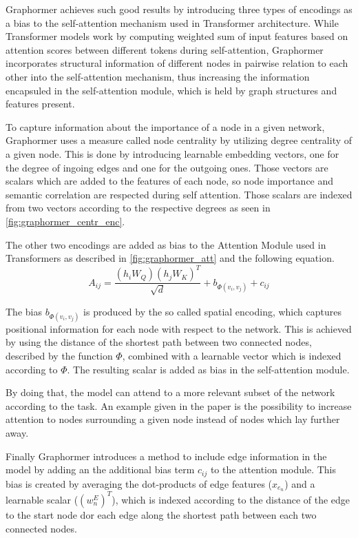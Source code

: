Graphormer achieves such good results by introducing three types of encodings as a bias to the self-attention mechanism used in Transformer architecture. While Transformer models work by computing weighted sum of input features based on attention scores between different tokens during self-attention, Graphormer incorporates structural information of different nodes in pairwise relation to each other into the self-attention mechanism, thus increasing the information encapsuled in the self-attention module, which is held by graph structures and features present.

To capture information about the importance of a node in a given network, Graphormer uses a measure called node centrality by utilizing degree centrality of a given node. This is done by introducing learnable embedding vectors, one for the degree of ingoing edges and one for the outgoing ones. Those vectors are scalars which are added to the features of each node, so node importance and semantic correlation are respected during self attention. Those scalars are indexed from two vectors according to the respective degrees as seen in \autoref{fig:graphormer_centr_enc}.

The other two encodings are added as bias to the Attention Module used in Transformers as described in \autoref{fig:graphormer_att} and the following equation.
\begin{equation}
    A_{ij} = \frac{(h_i W_Q)(h_j W_K)^T}{\sqrt{d}} + b_{\Phi (v_i, v_j)} + c_{ij}
    \label{eqn:attention-matrix}
\end{equation}

The bias $b_{\Phi (v_i, v_j)}$ is produced by the so called spatial encoding, which captures positional information for each node with respect to the network. This is achieved by using the distance of the shortest path between two connected nodes, described by the function $\Phi$, combined with a learnable vector which is indexed according to $\Phi$. The resulting scalar is added as bias in the self-attention module. 

By doing that, the model can attend to a more relevant subset of the network according to the task. An example given in the paper is the possibility to increase attention to nodes surrounding a given node instead of nodes which lay further away.

Finally Graphormer introduces a method to include edge information in the model by adding an the additional bias term $c_{ij}$ to the attention module. This bias is created by averaging the dot-products of edge features ($x_{e_n}$) and a learnable scalar ($(w_n^E)^T$), which is indexed according to the distance of the edge to the start node dor each edge along the shortest path between each two connected nodes.

